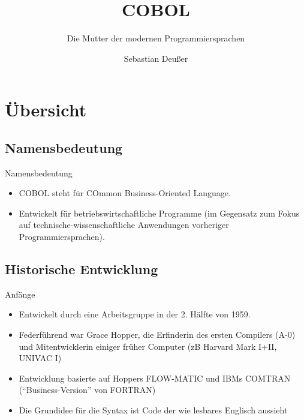 \documentclass{beamer}
\title[Short Paper Title] %
{COBOL}
\subtitle
{Die Mutter der modernen Programmiersprachen} %
\author %
{Sebastian Deußer}
\begin{document}
\begin{frame}
  \titlepage
\end{frame}





\section{Übersicht}

\subsection{Namensbedeutung}

\begin{frame}{Namensbedeutung}

  \begin{itemize}
  \item
    COBOL steht für COmmon Business-Oriented Language.
  \item
    Entwickelt für betriebswirtschaftliche Programme (im Gegensatz zum Fokus auf technische-wissenschaftliche Anwendungen vorheriger Programmiersprachen).
  \end{itemize}
\end{frame}

\subsection{Historische Entwicklung}

\begin{frame}{Anfänge}
  \begin{itemize}
  \item
    Entwickelt durch eine Arbeitsgruppe in der 2. Hälfte von 1959.
  \item
    Federführend war Grace Hopper, die Erfinderin des ersten Compilers (A-0) und Mitentwicklerin einiger früher Computer (zB Harvard Mark I+II, UNIVAC I)
  \item
    Entwicklung basierte auf Hoppers FLOW-MATIC und IBMs COMTRAN (``Business-Version'' von FORTRAN)
  \item
    Die Grundidee für die Syntax ist Code der wie lesbares Englisch aussieht
  \end{itemize}
\end{frame}
\end{document}
